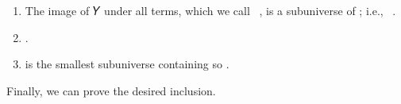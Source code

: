\documentclass[a4paper,USenglish,cleveref,autoref,thm-restate]{lipics-v2019}
\begin{document}
\begin{enumerate}
\item The image of 𝑌 under all terms, which we call ~, is a subuniverse of ; i.e., ~\AgdaSpace{}\AgdaSymbol{:=}\AgdaSpace{}\AgdaSymbol{\{(}\AgdaSpace{}\AgdaSpace{}\AgdaSymbol{)}\AgdaSpace{}\AgdaSpace{}\AgdaSymbol{|}\AgdaSpace{}\AgdaSpace{}\AgdaSymbol{:}\AgdaSpace{}\AgdaSymbol{(}\AgdaSymbol{)}\AgdaSymbol{,}\AgdaSpace{}\AgdaSpace{}\AgdaSymbol{:}\AgdaSpace{}\AgdaSpace{}\AgdaSymbol{\}}\AgdaSpace{}\AgdaSpace{}\AgdaSpace{}.
%
\item {}\AgdaSpace{}\AgdaSpace{}\AgdaSpace{}.
%
\item {}\AgdaSpace{} is the smallest subuniverse containing  so \AgdaSpace{}\AgdaSpace{}\AgdaSpace{}\AgdaSpace{}.
\end{enumerate}
\begin{code}\end{code}
Finally, we can prove the desired inclusion.
\begin{code}
\>[1]\AgdaSpace{}%
\AgdaSymbol{:}\AgdaSpace{}%
\AgdaSymbol{(}\AgdaSpace{}%
\AgdaSymbol{:}\AgdaSpace{}%
\AgdaSpace{}%
\AgdaSpace{}%
\AgdaSpace{}%
\AgdaSpace{}%
\AgdaSymbol{)}\AgdaSpace{}%
\AgdaSpace{}%
\AgdaSpace{}%
\AgdaSpace{}%
\AgdaSpace{}%
\AgdaSpace{}%
\<%
\\
\>[1]\AgdaSpace{}%
\AgdaSpace{}%
\AgdaSymbol{=}\AgdaSpace{}%
%
\>[775I]\AgdaSymbol{(}\AgdaSpace{}%
\AgdaSymbol{)}\AgdaSpace{}%
\AgdaSymbol{(}\AgdaSpace{}%
\AgdaSymbol{)}\<%
\end{code}

\end{document}
